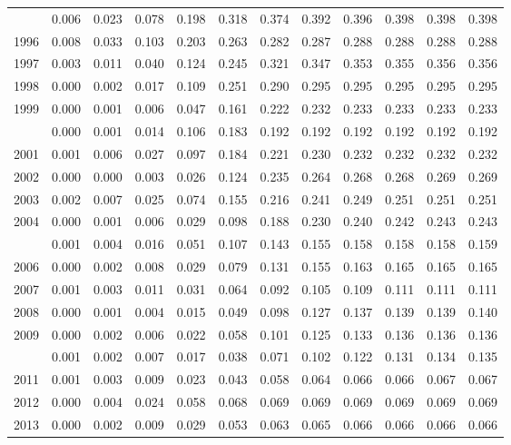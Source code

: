 \documentclass[
]{article}
\begin{document}
\begin{longtable}[t]{lrrrrrrrrrrr}
\addlinespace
1995 & 0.006 & 0.023 & 0.078 & 0.198 & 0.318 & 0.374 & 0.392 & 0.396 & 0.398 & 0.398 & 0.398\\
1996 & 0.008 & 0.033 & 0.103 & 0.203 & 0.263 & 0.282 & 0.287 & 0.288 & 0.288 & 0.288 & 0.288\\
1997 & 0.003 & 0.011 & 0.040 & 0.124 & 0.245 & 0.321 & 0.347 & 0.353 & 0.355 & 0.356 & 0.356\\
1998 & 0.000 & 0.002 & 0.017 & 0.109 & 0.251 & 0.290 & 0.295 & 0.295 & 0.295 & 0.295 & 0.295\\
1999 & 0.000 & 0.001 & 0.006 & 0.047 & 0.161 & 0.222 & 0.232 & 0.233 & 0.233 & 0.233 & 0.233\\
\addlinespace
2000 & 0.000 & 0.001 & 0.014 & 0.106 & 0.183 & 0.192 & 0.192 & 0.192 & 0.192 & 0.192 & 0.192\\
2001 & 0.001 & 0.006 & 0.027 & 0.097 & 0.184 & 0.221 & 0.230 & 0.232 & 0.232 & 0.232 & 0.232\\
2002 & 0.000 & 0.000 & 0.003 & 0.026 & 0.124 & 0.235 & 0.264 & 0.268 & 0.268 & 0.269 & 0.269\\
2003 & 0.002 & 0.007 & 0.025 & 0.074 & 0.155 & 0.216 & 0.241 & 0.249 & 0.251 & 0.251 & 0.251\\
2004 & 0.000 & 0.001 & 0.006 & 0.029 & 0.098 & 0.188 & 0.230 & 0.240 & 0.242 & 0.243 & 0.243\\
\addlinespace
2005 & 0.001 & 0.004 & 0.016 & 0.051 & 0.107 & 0.143 & 0.155 & 0.158 & 0.158 & 0.158 & 0.159\\
2006 & 0.000 & 0.002 & 0.008 & 0.029 & 0.079 & 0.131 & 0.155 & 0.163 & 0.165 & 0.165 & 0.165\\
2007 & 0.001 & 0.003 & 0.011 & 0.031 & 0.064 & 0.092 & 0.105 & 0.109 & 0.111 & 0.111 & 0.111\\
2008 & 0.000 & 0.001 & 0.004 & 0.015 & 0.049 & 0.098 & 0.127 & 0.137 & 0.139 & 0.139 & 0.140\\
2009 & 0.000 & 0.002 & 0.006 & 0.022 & 0.058 & 0.101 & 0.125 & 0.133 & 0.136 & 0.136 & 0.136\\
\addlinespace
2010 & 0.001 & 0.002 & 0.007 & 0.017 & 0.038 & 0.071 & 0.102 & 0.122 & 0.131 & 0.134 & 0.135\\
2011 & 0.001 & 0.003 & 0.009 & 0.023 & 0.043 & 0.058 & 0.064 & 0.066 & 0.066 & 0.067 & 0.067\\
2012 & 0.000 & 0.004 & 0.024 & 0.058 & 0.068 & 0.069 & 0.069 & 0.069 & 0.069 & 0.069 & 0.069\\
2013 & 0.000 & 0.002 & 0.009 & 0.029 & 0.053 & 0.063 & 0.065 & 0.066 & 0.066 & 0.066 & 0.066\\

\end{longtable}
\end{document}
